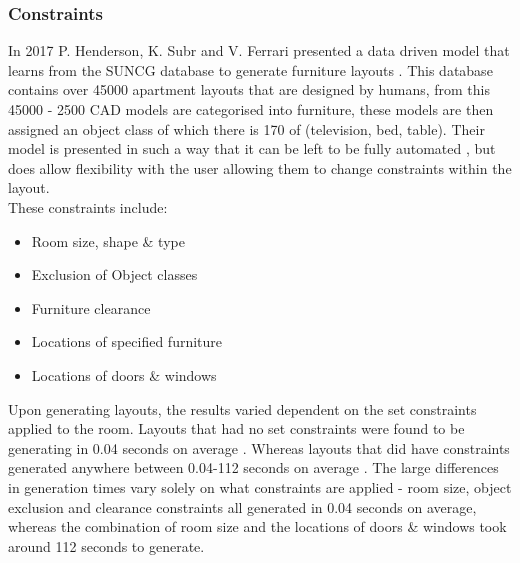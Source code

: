 \subsubsection*{Constraints}
In 2017 P. Henderson, K. Subr and V. Ferrari presented a data driven model that learns from the SUNCG \cite{suncg} database to generate furniture layouts \cite{constrained-layouts}. This database contains over 45000 apartment layouts that are designed by humans, from this 45000 - 2500 CAD models are categorised into furniture, these models are then assigned an object class of which there is 170 of (television, bed, table).
Their model is presented in such a way that it can be left to be fully automated \cite{constrained-layouts}, but does allow flexibility with the user allowing them to change constraints within the layout.\\
These constraints include:
\begin{itemize}
    \item Room size, shape \& type 
    \item Exclusion of Object classes
    \item Furniture clearance 
    \item Locations of specified furniture
    \item Locations of doors \& windows
\end{itemize}
Upon generating layouts, the results varied dependent on the set constraints applied to the room. Layouts that had no set constraints were found to be generating in 0.04 seconds on average \cite{constrained-layouts}. Whereas layouts that did have constraints generated anywhere between 0.04-112 seconds on average \cite{constrained-layouts}. The large differences in generation times vary solely on what constraints are applied -  room size, object exclusion and clearance constraints all generated in 0.04 seconds on average, whereas the combination of room size and the locations of doors \& windows took around 112 seconds to generate.

